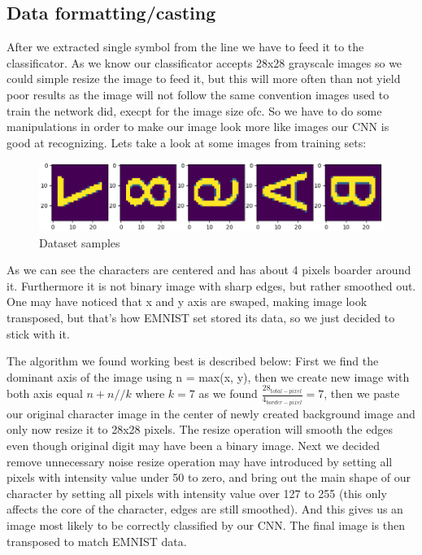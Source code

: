 \documentclass[Report.tex]{subfiles}
\begin{document}
\subsection{Data formatting/casting}\label{subsec:method:Data_formatting}
\begin{flushleft}
After we extracted single symbol from the line we have to feed it to the classificator. As we know our classificator accepts 28x28 grayscale images so we could simple resize the image to feed it, but this will more often than not yield poor results as the image will not follow the same convention images used to train the network did, execpt for the image size ofc. So we have to do some manipulations in order to make our image look more like images our CNN is good at recognizing. Lets take a look at some images from training sets:

\begin{figure}[H]
  \centering
  \includegraphics[width=\textwidth]{res/dataset_samples}
  \caption{Dataset samples}
  \label{fig:DATASET Samples}
\end{figure}

As we can see the characters are centered and has about 4 pixels boarder around it. Furthermore it is not binary image with sharp edges, but rather smoothed out. One may have noticed that x and y axis are swaped, making image look transposed, but that's how EMNIST set stored its data, so we just decided to stick with it.

The algorithm we found working best is described below:
First we find the dominant axis of the image using n = max(x, y), then we create new image with both axis equal $n + n//k$ where $k = 7$ as we found $\frac{28_{total-pixel}}{4_{border-pixel}} = 7$, then we paste our original character image in the center of newly created background image and only now resize it to 28x28 pixels. The resize operation will smooth the edges even though original digit may have been a binary image. Next we decided remove unnecessary noise resize operation may have introduced by setting all pixels with intensity value under 50 to zero, and bring out the main shape of our character by setting all pixels with intensity value over 127 to 255 (this only affects the core of the character, edges are still smoothed).
And this gives us an image most likely to be correctly classified by our CNN. The final image is then transposed to match EMNIST data.
\end{flushleft}
\end{document}
